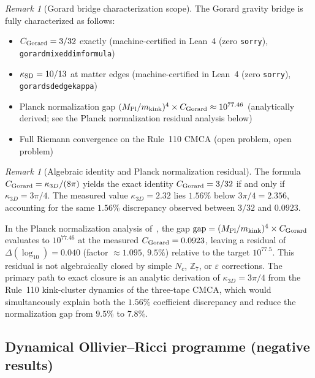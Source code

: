 \documentclass[11pt]{article}
\theoremstyle{remark}
\newtheorem{remark}[theorem]{Remark}
\newcommand{\lean}[1]{%
  \penalty-100
  \begingroup\def\_{\textunderscore\allowbreak}\texttt{#1}\endgroup}
\newcommand{\CatAL}{machine-certified in Lean~4 (zero \texttt{sorry})}
\newcommand{\CatAD}{analytically derived}
\newcommand{\CatD}{open problem}
\begin{document}
\begin{remark}[Gorard bridge characterization scope]
\label{rem:g24_scope}
The Gorard gravity bridge is fully characterized as follows:
\begin{itemize}[leftmargin=1.5em]
\item $C_{\rm Gorard} = 3/32$ exactly (\CatAL, \lean{gorard\_mixed\_dim\_formula})
\item $\kappa_{\rm SD} = 10/13$ at matter edges (\CatAL, \lean{gorard\_sd\_edge\_kappa})
\item Planck normalization gap $(M_{\rm Pl}/m_{\rm kink})^4 \times C_{\rm Gorard} \approx 10^{77.46}$
  (\CatAD; see the Planck normalization residual analysis below)
\item Full Riemann convergence on the Rule~110 CMCA (\CatD, open problem)
\end{itemize}
\end{remark}

\begin{remark}[Algebraic identity and Planck normalization residual]
\label{rem:gorard_planck_residual}
The formula $C_{\rm Gorard} = \kappa_{3D}/(8\pi)$ yields the exact identity
$C_{\rm Gorard} = 3/32$ if and only if $\kappa_{3D} = 3\pi/4$.
The measured value $\kappa_{3D} = 2.32$ lies $1.56\%$ below $3\pi/4 = 2.356$,
accounting for the same $1.56\%$ discrepancy observed between $3/32$ and $0.0923$.

In the Planck normalization analysis of~\cite{SpivackThreeTapeCMCA},
the gap $\text{gap} = (M_{\rm Pl}/m_{\rm kink})^4 \times C_{\rm Gorard}$ evaluates to
$10^{77.46}$ at the measured $C_{\rm Gorard} = 0.0923$, leaving a residual of
$\Delta(\log_{10}) = 0.040$ (factor $\approx 1.095$, $9.5\%$) relative to the
target $10^{77.5}$.
This residual is not algebraically closed by simple $N_c$, $\mathbb{Z}_7$, or
$\varepsilon$ corrections.
The primary path to exact closure is an analytic derivation of
$\kappa_{3D} = 3\pi/4$ from the Rule~110 kink-cluster dynamics of the three-tape
CMCA, which would simultaneously explain both the $1.56\%$ coefficient discrepancy
and reduce the normalization gap from $9.5\%$ to $7.8\%$.
\end{remark}

\subsection{Dynamical Ollivier--Ricci programme (negative results)}
\label{ssec:or_dynamical_negative}
\end{document}
